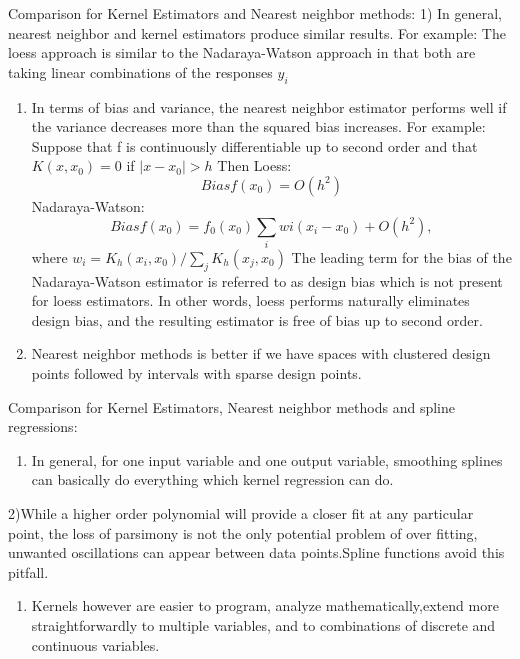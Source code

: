 \documentclass[]{article}
\providecommand{\tightlist}{%
  \setlength{\itemsep}{0pt}\setlength{\parskip}{0pt}}
\begin{document}
Comparison for Kernel Estimators and Nearest neighbor methods: 1) In
general, nearest neighbor and kernel estimators produce similar results.
For example: The loess approach is similar to the Nadaraya-Watson
approach in that both are taking linear combinations of the responses
\(y_i\)

\begin{enumerate}
\def\labelenumi{\arabic{enumi})}
\setcounter{enumi}{1}
\item
  In terms of bias and variance, the nearest neighbor estimator performs
  well if the variance decreases more than the squared bias increases.
  For example: Suppose that f is continuously differentiable up to
  second order and that \(K(x,x_0) = 0\) if \(|x − x_0| > h\) Then
  Loess: \[Bias{f(x_0) = O(h^2)}\] Nadaraya-Watson:
  \[Bias{f(x_0)} = f_0(x_0)\sum_{i}wi(x_i − x_0) + O(h^2),\] where
  \(w_i = K_h(x_i,x_0)/\sum_{j}K_h(x_j,x_0)\) The leading term for the
  bias of the Nadaraya-Watson estimator is referred to as design bias
  which is not present for loess estimators. In other words, loess
  performs naturally eliminates design bias, and the resulting estimator
  is free of bias up to second order.
\item
  Nearest neighbor methods is better if we have spaces with clustered
  design points followed by intervals with sparse design points.
\end{enumerate}

Comparison for Kernel Estimators, Nearest neighbor methods and spline
regressions:

\begin{enumerate}
\def\labelenumi{\arabic{enumi})}
\tightlist
\item
  In general, for one input variable and one output variable, smoothing
  splines can basically do everything which kernel regression can do.
\end{enumerate}

2)While a higher order polynomial will provide a closer fit at any
particular point, the loss of parsimony is not the only potential
problem of over fitting, unwanted oscillations can appear between data
points.Spline functions avoid this pitfall.

\begin{enumerate}
\def\labelenumi{\arabic{enumi})}
\setcounter{enumi}{2}
\tightlist
\item
  Kernels however are easier to program, analyze mathematically,extend
  more straightforwardly to multiple variables, and to combinations of
  discrete and continuous variables.
\end{enumerate}
\end{document}
